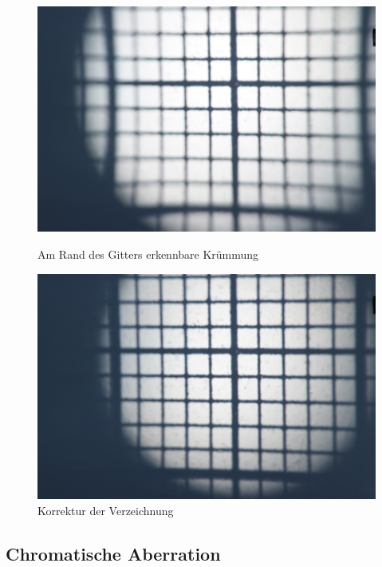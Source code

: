 \begin{figure}[h!]
	\begin{minipage}[t]{0.48\textwidth}
		\includegraphics[width=\linewidth]{img/Verzeichnung/Prakt_Linsenfehler_2015_06_04_082}
		\caption{Am Rand des Gitters erkennbare Krümmung}
		\label{fig:verzeichnung}
	\end{minipage}
	\hfill
	\begin{minipage}[t]{0.48\textwidth}
		\includegraphics[width=\linewidth]{img/Verzeichnung/Prakt_Linsenfehler_2015_06_04_083}
		\caption{Korrektur der Verzeichnung}
		\label{fig:verzeichnung_korrigiert}
	\end{minipage}
\end{figure}

\subsection{Chromatische Aberration}

